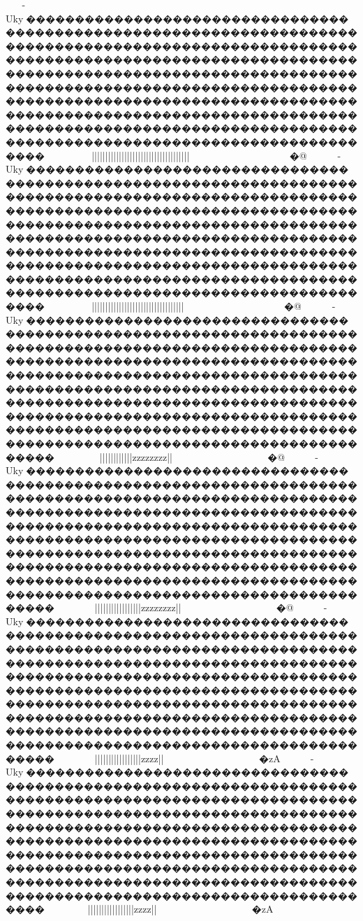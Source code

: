 {{{{{{{{{-Uky�������������������������������������������������������������������������������������������������������������������������������������������������������������������������������������������������������������������������������������������������������������������������������������������������������������������������������������������������������������������������~~~}}~}}}}}}||||||||||||||||||||||||{{||||{{{{{{{{||||{{{{||||}}}}~~~~~~~~~~~~~~~~�{@	-Uky�������������������������������������������������������������������������������������������������������������������������������������������������������������������������������������������������������������������������������������������������������������������������������������������������������������������������������������������������������������������������~~~}}~}}}}}}||||||||||||||||||||||{{{{||||{{{{{{{{||||{{{{||||}}}}~~~~~~~~~~~~~~~~�{@	-Uky��������������������������������������������������������������������������������������������������������������������������������������������������������������������������������������������������������������������������������������������������������������������������������������������������������������������������������������������������������������������������~~~~~~~}}}}|||}}}{{|{{{{{{{{{{{||||||||{{{{{{{{zzzzzzzz{{{{{{{{{{{{||}}}~~~~~~~~~~~~~~~�{@-Uky��������������������������������������������������������������������������������������������������������������������������������������������������������������������������������������������������������������������������������������������������������������������������������������������������������������������������������������������������������������������������~~}~~~~}||}|||}}}{{||||{{{{{{{{||||||||{{{{{{{{zzzzzzzz{{{{{{{{{{{{||}}}~~~~~~~~~~~~~~~�{@-Uky��������������������������������������������������������������������������������������������������������������������������������������������������������������������������������������������������������������������������������������������������������������������������������������������������������������������������������������������������������������������������~~}~~~~}||}|||}}}{{||||{{{{{{{{||||||||{{{{{{{{{{{{zzzz{{{{{{{{{{{{||}}}~~~~~~~~~~~~~~~�zA-Uky�������������������������������������������������������������������������������������������������������������������������������������������������������������������������������������������������������������������������������������������������������������������������������������������������������������������������������������������������������������������������~~}~~~~}||}|||}}}{{||||{{{{{{{{||||||||{{{{{{{{{{{{zzzz{{{{{{{{{{{{||}}}~~~~~~~~~~~~~~~�zA
}}}}}}}}}}}}}}}}}}}}}}}}}}}}}}}}}}}}}}}}}}}}}}}}}}}}}}}}}}}}}}}}}}}}}}}}}}}}}}}}}}}}}}}}}}}}}}}}}}}}}}}}}}}}}}}}}
